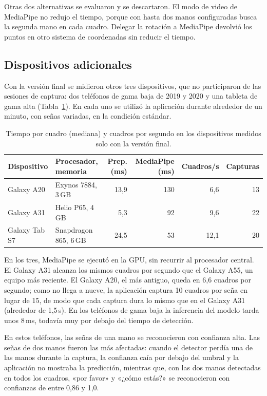 Otras dos alternativas se evaluaron y se descartaron. El modo de video de MediaPipe no redujo el tiempo, porque con hasta dos manos configuradas busca la segunda mano en cada cuadro. Delegar la rotación a MediaPipe devolvió los puntos en otro sistema de coordenadas sin reducir el tiempo.

\subsection{Dispositivos adicionales}

Con la versión final se midieron otros tres dispositivos, que no participaron de las sesiones de captura: dos teléfonos de gama baja de 2019 y 2020 y una tableta de gama alta (Tabla~\ref{tab:rendimiento-extra}). En cada uno se utilizó la aplicación durante alrededor de un minuto, con señas variadas, en la condición estándar.

\begin{table}[h]
    \centering
    \small
    \setlength{\tabcolsep}{4pt}
    \begin{tabular}{llrrrr}
        \toprule
        Dispositivo & Procesador, memoria & Prep. (ms) & MediaPipe (ms) & Cuadros/s & Capturas \\
        \midrule
        Galaxy A20 & Exynos 7884, 3\,GB & 13,9 & 130 & 6,6 & 13 \\
        Galaxy A31 & Helio P65, 4\,GB & 5,3 & 92 & 9,6 & 22 \\
        Galaxy Tab S7 & Snapdragon 865, 6\,GB & 24,5 & 53 & 12,1 & 20 \\
        \bottomrule
    \end{tabular}
    \caption{Tiempo por cuadro (mediana) y cuadros por segundo en los dispositivos medidos solo con la versión final.}
    \label{tab:rendimiento-extra}
\end{table}

En los tres, MediaPipe se ejecutó en la GPU, sin recurrir al procesador central. El Galaxy A31 alcanza los mismos cuadros por segundo que el Galaxy A55, un equipo más reciente. El Galaxy A20, el más antiguo, queda en 6,6 cuadros por segundo; como no llega a nueve, la aplicación captura 10 cuadros por seña en lugar de 15, de modo que cada captura dura lo mismo que en el Galaxy A31 (alrededor de 1,5\,s). En los teléfonos de gama baja la inferencia del modelo tarda unos 8\,ms, todavía muy por debajo del tiempo de detección.

En estos teléfonos, las señas de una mano se reconocieron con confianza alta. Las señas de dos manos fueron las más afectadas: cuando el detector perdía una de las manos durante la captura, la confianza caía por debajo del umbral y la aplicación no mostraba la predicción, mientras que, con las dos manos detectadas en todos los cuadros, «por favor» y «¿cómo estás?» se reconocieron con confianzas de entre 0,86 y 1,0.

